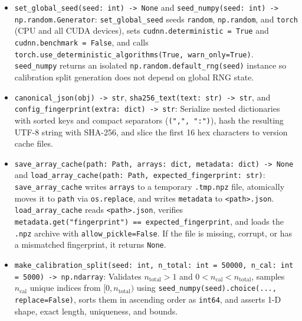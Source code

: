 \documentclass[11pt,a4paper]{article}
\begin{document}
\begin{itemize}
  \item \texttt{set\_\allowbreak{}global\_\allowbreak{}seed(\allowbreak{}seed: int) -> None} and \texttt{seed\_\allowbreak{}numpy(\allowbreak{}seed: int) -> np.\allowbreak{}random.\allowbreak{}Generator}: \texttt{set\_\allowbreak{}global\_\allowbreak{}seed} seeds \texttt{random}, \texttt{np.\allowbreak{}random}, and \texttt{torch} (CPU and all CUDA devices), sets \texttt{cudnn.\allowbreak{}deterministic = True} and \texttt{cudnn.\allowbreak{}benchmark = False}, and calls \texttt{torch.\allowbreak{}use\_\allowbreak{}deterministic\_\allowbreak{}algorithms(\allowbreak{}True,\allowbreak{} warn\_\allowbreak{}only=True)}. \texttt{seed\_\allowbreak{}numpy} returns an isolated \texttt{np.\allowbreak{}random.\allowbreak{}default\_\allowbreak{}rng(\allowbreak{}seed)} instance so calibration split generation does not depend on global RNG state.
  \item \texttt{canonical\_\allowbreak{}json(\allowbreak{}obj) -> str}, \texttt{sha256\_\allowbreak{}text(\allowbreak{}text: str) -> str}, and \texttt{config\_\allowbreak{}fingerprint(\allowbreak{}extra: dict) -> str}: Serialize nested dictionaries with sorted keys and compact separators (\texttt{(\allowbreak{}",",\allowbreak{} ":")}), hash the resulting UTF-8 string with SHA-256, and slice the first 16 hex characters to version cache files.
  \item \texttt{save\_\allowbreak{}array\_\allowbreak{}cache(\allowbreak{}path: Path,\allowbreak{} arrays: dict,\allowbreak{} metadata: dict) -> None} and \texttt{load\_\allowbreak{}array\_\allowbreak{}cache(\allowbreak{}path: Path,\allowbreak{} expected\_\allowbreak{}fingerprint: str)}: \texttt{save\_\allowbreak{}array\_\allowbreak{}cache} writes \texttt{arrays} to a temporary \texttt{.\allowbreak{}tmp.\allowbreak{}npz} file, atomically moves it to \texttt{path} via \texttt{os.\allowbreak{}replace}, and writes \texttt{metadata} to \texttt{<path>.\allowbreak{}json}. \texttt{load\_\allowbreak{}array\_\allowbreak{}cache} reads \texttt{<path>.\allowbreak{}json}, verifies \texttt{metadata.\allowbreak{}get(\allowbreak{}"fingerprint") == expected\_\allowbreak{}fingerprint}, and loads the \texttt{.\allowbreak{}npz} archive with \texttt{allow\_\allowbreak{}pickle=False}. If the file is missing, corrupt, or has a mismatched fingerprint, it returns \texttt{None}.
  \item \texttt{make\_\allowbreak{}calibration\_\allowbreak{}split(\allowbreak{}seed: int,\allowbreak{} n\_\allowbreak{}total: int = 50000,\allowbreak{} n\_\allowbreak{}cal: int = 5000) -> np.\allowbreak{}ndarray}: Validates $n_{\text{total}} > 1$ and $0 < n_{\text{cal}} < n_{\text{total}}$, samples $n_{\text{cal}}$ unique indices from $[0, n_{\text{total}})$ using \texttt{seed\_\allowbreak{}numpy(\allowbreak{}seed).\allowbreak{}choice(\allowbreak{}.\allowbreak{}.\allowbreak{}.\allowbreak{},\allowbreak{} replace=False)}, sorts them in ascending order as \texttt{int64}, and asserts 1-D shape, exact length, uniqueness, and bounds.

\end{itemize}
\end{document}
